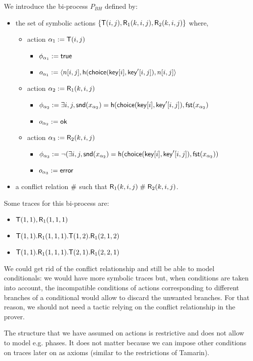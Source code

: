 \begin{example}
  \label{ex:basic-hash-bi-process}
  We introduce the bi-process $P_{BH}$ defined by:
  \begin{itemize}
    \item the set of symbolic actions $\{\textsf{T}(i,j),\textsf{R}_1(k,i,j),\textsf{R}_2(k,i,j)\}$ where,
    \begin{itemize}
      \item action $\alpha_1 := \textsf{T}(i,j)$
        \begin{itemize}
          \item $\phi_{\alpha_1} := \textsf{true}$
          \item $o_{\alpha_1} := \langle n[i,j], \mathsf{h}(\mathsf{choice}(\mathsf{key}[i],\mathsf{key}'[i,j]),n[i,j] \rangle$
        \end{itemize}
      \item action $\alpha_2 := \textsf{R}_1(k,i,j)$
        \begin{itemize}
          \item $\phi_{\alpha_2} := \exists i,j, \mathsf{snd}(x_{\alpha_2}) =  \mathsf{h}(\mathsf{choice}(\mathsf{key}[i],\mathsf{key}'[i,j]),\mathsf{fst}(x_{\alpha_2})$
          \item $o_{\alpha_2} := \mathsf{ok}$
        \end{itemize}
      \item action $\alpha_3 := \textsf{R}_2(k,i,j)$
        \begin{itemize}
          \item $\phi_{\alpha_3} := \neg (\exists i,j, \mathsf{snd}(x_{\alpha_2}) =  \mathsf{h}(\mathsf{choice}(\mathsf{key}[i],\mathsf{key}'[i,j]),\mathsf{fst}(x_{\alpha_2}))$
          \item $o_{\alpha_3} := \mathsf{error}$
        \end{itemize}
    \end{itemize}
    \item a conflict relation $\mathrel{\#}$ such that $\textsf{R}_1(k,i,j)\mathrel{\#}\textsf{R}_2(k,i,j)$.
  \end{itemize}

\noindent
Some traces for this bi-process are:
  \begin{itemize}
    \item $\textsf{T}(1,1),\textsf{R}_1(1,1,1)$
    \item $\textsf{T}(1,1).\textsf{R}_1(1,1,1).\textsf{T}(1,2).\textsf{R}_1(2,1,2)$
    \item $\textsf{T}(1,1).\textsf{R}_1(1,1,1).\textsf{T}(2,1).\textsf{R}_1(2,2,1)$
  \end{itemize}
\end{example}

\bigskip
\noindent
\begin{remark}
  We could get rid of the conflict relationship and still be able to
  model conditionals: we would have more symbolic traces but, when conditions
  are taken into account, the incompatible conditions of actions corresponding
  to different branches of a conditional would allow to discard
  the unwanted branches. For that reason, we should not need a tactic
  relying on the conflict relationship in the prover.
\end{remark}

\begin{remark}
  The structure that we have assumed on actions is restrictive and
  does not allow to model e.g. phases. It does not matter because we can
  impose other conditions on traces later on as axioms (similar to the
  restrictions of Tamarin).
\end{remark}
